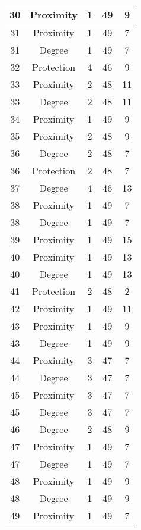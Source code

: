 \documentclass[results.tex]{subfiles}
\begin{document}
\begin{center}
\begin{tabular}{| c || c | c | c | c |}
    \hline
    30 & Proximity & 1 & 49 & 9 \\ 
    \hline
    31 & Proximity & 1 & 49 & 7 \\ 
    \hline
    31 & Degree & 1 & 49 & 7 \\ 
    \hline
    32 & Protection & 4 & 46 & 9 \\ 
    \hline
    33 & Proximity & 2 & 48 & 11 \\ 
    \hline
    33 & Degree & 2 & 48 & 11 \\ 
    \hline
    34 & Proximity & 1 & 49 & 9 \\ 
    \hline
    35 & Proximity & 2 & 48 & 9 \\ 
    \hline
    36 & Degree & 2 & 48 & 7 \\ 
    \hline
    36 & Protection & 2 & 48 & 7 \\ 
    \hline
    37 & Degree & 4 & 46 & 13 \\ 
    \hline
    38 & Proximity & 1 & 49 & 7 \\ 
    \hline
    38 & Degree & 1 & 49 & 7 \\ 
    \hline
    39 & Proximity & 1 & 49 & 15 \\ 
    \hline
    40 & Proximity & 1 & 49 & 13 \\ 
    \hline
    40 & Degree & 1 & 49 & 13 \\ 
    \hline
    41 & Protection & 2 & 48 & 2 \\ 
    \hline
    42 & Proximity & 1 & 49 & 11 \\ 
    \hline
    43 & Proximity & 1 & 49 & 9 \\ 
    \hline
    43 & Degree & 1 & 49 & 9 \\ 
    \hline
    44 & Proximity & 3 & 47 & 7 \\ 
    \hline
    44 & Degree & 3 & 47 & 7 \\ 
    \hline
    45 & Proximity & 3 & 47 & 7 \\ 
    \hline
    45 & Degree & 3 & 47 & 7 \\ 
    \hline
    46 & Degree & 2 & 48 & 9 \\ 
    \hline
    47 & Proximity & 1 & 49 & 7 \\ 
    \hline
    47 & Degree & 1 & 49 & 7 \\ 
    \hline
    48 & Proximity & 1 & 49 & 9 \\ 
    \hline
    48 & Degree & 1 & 49 & 9 \\ 
    \hline
    49 & Proximity & 1 & 49 & 7 \\ 
    \hline   \end{tabular}
\end{center}
\end{document}
